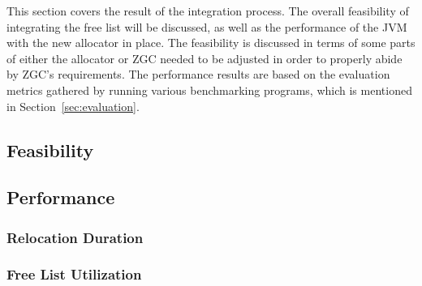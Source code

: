 
This section covers the result of the integration process. The overall feasibility of integrating the free list will be discussed, as well as the performance of the JVM with the new allocator in place. The feasibility is discussed in terms of some parts of either the allocator or ZGC needed to be adjusted in order to properly abide by ZGC's requirements. The performance results are based on the evaluation metrics gathered by running various benchmarking programs, which is mentioned in Section~\ref{sec:evaluation}.

\subsection{Feasibility}



\subsection{Performance}
\subsubsection{Relocation Duration}


\subsubsection{Free List Utilization}
